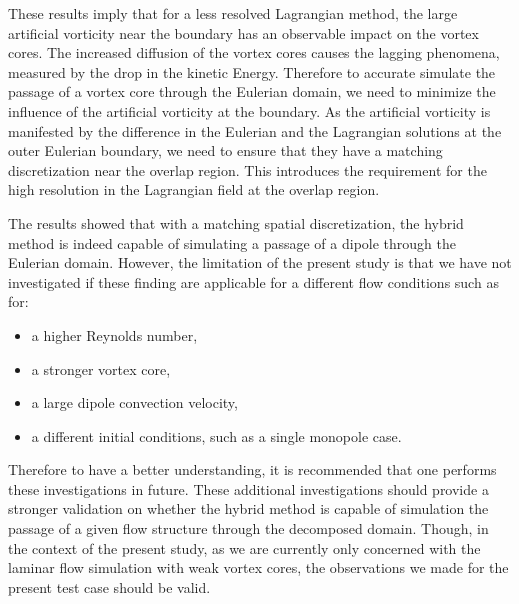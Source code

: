 These results imply that for a less resolved Lagrangian method, the large artificial vorticity near the boundary has an observable impact on the vortex cores. The increased diffusion of the vortex cores causes the lagging phenomena, measured by the drop in the kinetic Energy. Therefore to accurate simulate the passage of a vortex core through the Eulerian domain, we need to minimize the influence of the artificial vorticity at the boundary. As the artificial vorticity is manifested by the difference in the Eulerian and the Lagrangian solutions at the outer Eulerian boundary, we need to ensure that they have a matching discretization near the overlap region. This introduces the requirement for the high resolution in the Lagrangian field at the overlap region. 

The results showed that with a matching spatial discretization, the hybrid method is indeed capable of simulating a passage of a dipole through the Eulerian domain. However, the limitation of the present study is that we have not investigated if these finding are applicable for a different flow conditions such as for:
\begin{itemize}
\item a higher Reynolds number,
\item a stronger vortex core,
\item a large dipole convection velocity,
\item a different initial conditions, such as a single monopole case.
\end{itemize}

Therefore to have a better understanding, it is recommended that one performs these investigations in future. These additional investigations should provide a stronger validation on whether the hybrid method is capable of simulation the passage of a given flow structure through the decomposed domain. Though, in the context of the present study, as we are currently only concerned with the laminar flow simulation with weak vortex cores, the observations we made for the present test case should be valid.




